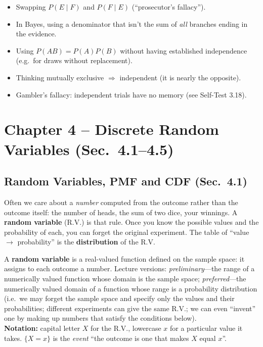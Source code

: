 \documentclass[11pt]{article}
\let\oldsubsection\subsection
\renewcommand{\subsection}{\Needspace{14\baselineskip}\oldsubsection}
\begin{document}
\begin{warnbox}
\begin{itemize}
\item Swapping $P(E\mid F)$ and $P(F\mid E)$ (``prosecutor's fallacy'').
\item In Bayes, using a denominator that isn't the sum of \emph{all} branches ending in the evidence.
\item Using $P(AB)=P(A)P(B)$ without having established independence (e.g.\ for draws without replacement).
\item Thinking mutually exclusive $\Rightarrow$ independent (it is nearly the opposite).
\item Gambler's fallacy: independent trials have no memory (see Self-Test 3.18).
\end{itemize}
\end{warnbox}

\clearpage
\section{Chapter 4 -- Discrete Random Variables (Sec.\ 4.1--4.5)}\label{sec:ch4}

\subsection{Random Variables, PMF and CDF (Sec.\ 4.1)}

\begin{ideabox}
Often we care about a \emph{number} computed from the outcome rather than the outcome itself: the number of heads, the sum of two dice, your winnings. A \textbf{random variable} (R.V.) is that rule. Once you know the possible values and the probability of each, you can forget the original experiment. The table of ``value $\to$ probability'' is the \textbf{distribution} of the R.V.
\end{ideabox}

\begin{defbox}
A \textbf{random variable} is a real-valued function defined on the sample space: it assigns to each outcome a number. Lecture versions: \emph{preliminary}---the range of a numerically valued function whose domain is the sample space; \emph{preferred}---the numerically valued domain of a function whose range is a probability distribution (i.e.\ we may forget the sample space and specify only the values and their probabilities; different experiments can give the same R.V.; we can even ``invent'' one by making up numbers that satisfy the conditions below).\\
\textbf{Notation:} capital letter $X$ for the R.V., lowercase $x$ for a particular value it takes. $\{X=x\}$ is the \emph{event} ``the outcome is one that makes $X$ equal $x$''.
\end{defbox}
\end{document}
